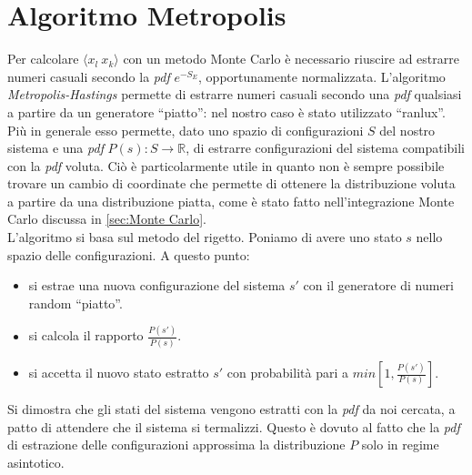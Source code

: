 \section{Algoritmo Metropolis}
Per calcolare $\langle x_l \ x_k \rangle $ con un metodo Monte Carlo è necessario riuscire ad estrarre numeri casuali secondo la \emph{pdf} $ e^{-S_E}$, opportunamente normalizzata.
L'algoritmo \emph{Metropolis-Hastings} permette di estrarre numeri casuali secondo una \emph{pdf} qualsiasi a partire da un generatore ``piatto'':
nel nostro caso è stato utilizzato ``ranlux''.\\
Più in generale esso permette, dato uno spazio di configurazioni $S$ del nostro sistema e una \emph{pdf} $ P(s) : S \rightarrow \mathbb{R}$, di estrarre
configurazioni del sistema compatibili con la \emph{pdf} voluta. Ciò è particolarmente utile in quanto non è sempre possibile trovare un cambio
di coordinate che permette di ottenere la distribuzione voluta a partire da una distribuzione piatta,
come è stato fatto nell'integrazione Monte Carlo discussa in \ref{sec:Monte Carlo}.\\
L'algoritmo si basa sul metodo del rigetto. Poniamo di avere uno stato $s$ nello spazio delle configurazioni. A questo punto:
\begin{itemize}
  \item si estrae una nuova configurazione del sistema $s'$ con il generatore di numeri random ``piatto''.
  \item si calcola il rapporto $ \frac{P(s')}{P(s)}$.
  \item si accetta il nuovo stato estratto $s'$ con probabilità pari a $ min\left[ 1,\frac{P(s')}{P(s)} \right]$.
\end{itemize}
Si dimostra che gli stati del sistema vengono estratti con la \emph{pdf} da noi cercata,
a patto di attendere che il sistema si termalizzi.
Questo è dovuto al fatto che la \emph{pdf} di estrazione delle configurazioni approssima la distribuzione $P$ solo in regime asintotico.
